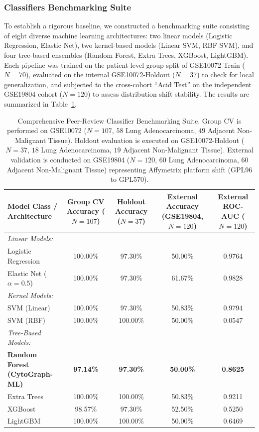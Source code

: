 \documentclass[journal,10pt]{IEEEtran}
\begin{document}
\subsubsection{Classifiers Benchmarking Suite}
To establish a rigorous baseline, we constructed a benchmarking suite consisting of eight diverse machine learning architectures: two linear models (Logistic Regression, Elastic Net), two kernel-based models (Linear SVM, RBF SVM), and four tree-based ensembles (Random Forest, Extra Trees, XGBoost, LightGBM). Each pipeline was trained on the patient-level group split of GSE10072-Train ($N=70$), evaluated on the internal GSE10072-Holdout ($N=37$) to check for local generalization, and subjected to the cross-cohort ``Acid Test'' on the independent GSE19804 cohort ($N=120$) to assess distribution shift stability. The results are summarized in Table~\ref{tab:model_comparison}.

\begin{table}[htbp]
\centering
\caption{Comprehensive Peer-Review Classifier Benchmarking Suite. Group CV is performed on GSE10072 ($N=107$, $58$ Lung Adenocarcinoma, $49$ Adjacent Non-Malignant Tissue). Holdout evaluation is executed on GSE10072-Holdout ($N=37$, $18$ Lung Adenocarcinoma, $19$ Adjacent Non-Malignant Tissue). External validation is conducted on GSE19804 ($N=120$, $60$ Lung Adenocarcinoma, $60$ Adjacent Non-Malignant Tissue) representing Affymetrix platform shift (GPL96 to GPL570).}
\label{tab:model_comparison}
\begin{tabular}{lcccc}
\toprule
\textbf{Model Class / Architecture} & \textbf{Group CV Accuracy ($N=107$)} & \textbf{Holdout Accuracy ($N=37$)} & \textbf{External Accuracy (GSE19804, $N=120$)} & \textbf{External ROC-AUC ($N=120$)} \\
\midrule
\textit{Linear Models:} & & & & \\
Logistic Regression & 100.00\% & 97.30\% & 50.00\% & 0.9764 \\
Elastic Net ($\alpha=0.5$) & 100.00\% & 97.30\% & 61.67\% & 0.9828 \\
\midrule
\textit{Kernel Models:} & & & & \\
SVM (Linear) & 100.00\% & 97.30\% & 50.83\% & 0.9794 \\
SVM (RBF) & 100.00\% & 100.00\% & 50.00\% & 0.0547 \\
\midrule
\textit{Tree-Based Models:} & & & & \\
\textbf{Random Forest (CytoGraph-ML)} & \textbf{97.14\%} & \textbf{97.30\%} & \textbf{50.00\%} & \textbf{0.8625} \\
Extra Trees & 100.00\% & 100.00\% & 50.83\% & 0.9211 \\
XGBoost & 98.57\% & 97.30\% & 52.50\% & 0.5250 \\
LightGBM & 100.00\% & 100.00\% & 50.00\% & 0.6469 \\
\bottomrule
\end{tabular}
\end{table}
\end{document}
